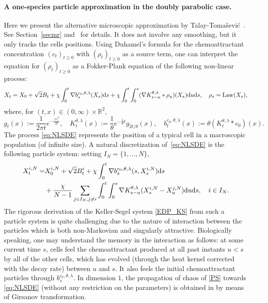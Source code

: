 \documentclass[11pt]{article}
\newcommand{\R}{\mathbb{R}}
\newcommand{\1}{\mathbbm{1}}
\newcommand{\dd}{{\rm d}}
\newcommand{\vip}{\vskip5pt}
\begin{document}
\paragraph{A one-species particle approximation in the doubly parabolic case.}
Here we present the alternative microscopic approximation by Talay-Tomašević~\cite{Mi-De}.
See Section~\ref{secmr} and~\cite[Section~1]{FT1} for details.
It does not involve any smoothing, but it only tracks the cells positions. Using Duhamel's formula for the chemoattractant concentration $(c_t)_{t\geq 0}$ with $(\rho_t)_{t\geq 0}$ as a source term, one can interpret the equation for $(\rho_t)_{t\geq 0}$ as a Fokker-Plank equation of the following non-linear process:
\begin{equation}\label{eq:NLSDE}
X_t= X_0 + \sqrt{2} B_t + \chi \int_0^t \nabla b_s^{c_0,\theta,\lambda}(X_s)\dd s 
+ \chi \int_0^t\int_0^s (\nabla K^{\theta,\lambda}_{s-u}\ast \rho_u)(X_s) \dd u\dd s,
\quad \rho_s={\rm Law}(X_s),
\end{equation}
where, for $ (t,x) \in (0,\infty)\times \R^2$,
\begin{equation}\label{gkb}
g_t(x):=\frac{1}{2\pi t} e^{-\frac{|x|^2}{2t}}, \quad 
K_t^{\theta,\lambda}(x):= \frac{1}{\theta} e^{-\frac{\lambda}{\theta}t}g_{2t/\theta}(x),  
\quad b_t^{c_0,\theta,\lambda} (x):= \theta (K^{\theta,\lambda}_t \ast  c_0)(x).
\end{equation}
The process \eqref{eq:NLSDE} represents the position of a  typical cell in a macroscopic population (of infinite size). A natural discretization of~\eqref{eq:NLSDE} is the following particle system: setting $I_N=\{1,\dots, N\}$,
\begin{align}\label{PS}
X_t^{i,N}=& X_0^{i,N} + \sqrt{2} B_t^i + \chi \int_0^t \nabla b_s^{c_0,\theta,\lambda}(s,X_s^{i,N})\dd s \\
&+ \frac{\chi}{N-1} \sum_{j \in I_N,j\neq i}
\int_0^t \int_0^s \nabla K^{\theta,\lambda}_{s-u} ( X^{i,N}_s-X^{j,N}_u)  \dd u \dd s,
\quad i \in I_N.\notag
\end{align}
The rigorous derivation of the Keller-Segel system \eqref{EDP_KS} from such a particle system is quite challenging due to the nature of interaction between the particles which is both non-Markovian and singularly attractive. Biologically speaking, one may understand the memory in the interaction as follows: at some current time $s$, cells feel the chemoattractant produced at all past instants $u<s$ by all of the other cells, which has evolved (through the heat kernel corrected with the decay rate) between $u$ and $s$.
It also feels the initial chemoattractant particles through $b_s^{c_0,\theta,\lambda}$.
\vip
In dimension $1$, the propagation  of chaos of \eqref{PS} towards \eqref{eq:NLSDE} (without any restriction on the parameters) is obtained  in \cite{JTT}  by means of Girsanov transformation.
\end{document}
